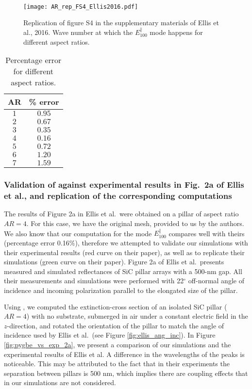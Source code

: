 \begin{figure}
    \centering
    \texttt{[image: AR\_rep\_FS4\_Ellis2016.pdf]} 
    \caption{Replication of figure S4 in the supplementary materials of Ellis et al., 2016. Wave
    number at which the $E^{\parallel}_{100}$ mode happens for different aspect ratios.}
    \label{fig:rep_FS4_ellis}
 \end{figure}
 
 \begin{table}
    \centering
    \caption{Percentage error for different aspect ratios.} 
    \label{tab:err_AR}
    \begin{tabular}{c c}
    \hline%
    AR & \% error \\
    \hline%
     $1$ & $0.95$ \\
     $2$ & $0.67$ \\
     $3$ & $0.35$ \\
     $4$ & $0.16$ \\
     $5$ & $0.72$ \\
     $6$ & $1.20$ \\
     $7$ & $1.59$ \\
    \hline%
    \end{tabular}
\end{table}

\subsubsection{Validation of \pygbe against experimental results in Fig.\ 2a  of Ellis et al., and replication of the corresponding computations}

The results of Figure 2a in Ellis et al.\ were obtained on a pillar of aspect ratio $AR=4$. For this case,
we have the original mesh, provided to us by the authors. We also know that our computation 
for the mode $E^{\parallel}_{100}$ compares well with theirs (percentage error 0.16$\%$), therefore we
attempted to validate our simulations with their experimental results (red curve on their paper), as well 
as to replicate their simulations (green curve on their paper).
Figure 2a of Ellis et al.\ presents measured and simulated reflectances of SiC pillar
arrays with a 500-nm gap. All their measurements and simulations were performed with 
22$^\circ$ off-normal angle of incidence and incoming polarization parallel to the 
elongated size of the pillar. 

Using \pygbe, we computed the extinction-cross section of an isolated SiC pillar ($AR=4$)
with no substrate, submerged in air under a constant electric field in the $z$-direction, 
and rotated the orientation of the pillar to match the angle of incidence used by Ellis et al.\ (see Figure \ref{fig:ellis_ang_inc}).
In Figure \ref{fig:pygbe_vs_exp_2a}, we present a 
comparison of our simulations and the experimental results of Ellis et al. A 
difference in the wavelengths of the peaks is noticeable. This may be attributed to the
fact that in their experiments the separation between pillars is 500 nm, which implies
there are coupling effects that in our simulations are not considered.  

